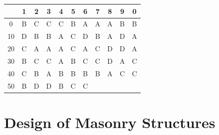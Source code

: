 \documentclass[11pt,a4paper]{article}
\begin{document}
\begin{tabular}{ | c | c c c c c c c c c c | }
\hline
 & 1 & 2 & 3 & 4 & 5 & 6 & 7 & 8 & 9 & 0 \\
\hline
0 & B & C & C & C & B & A & A & A & B & B \\
10 & D & B & B & A & C & D & B & A & D & A \\
20 & C & A & A & A & C & A & C & D & D & A \\
30 & B & C & C & A & B & C & C & D & A & C \\
40 & C & B & A & B & B & B & B & A & C & C \\
50 & B & D & D & B & C & C &   &   &   &   \\
\hline
\end{tabular}
\clearpage
\section{Design of Masonry Structures}
\end{document}
